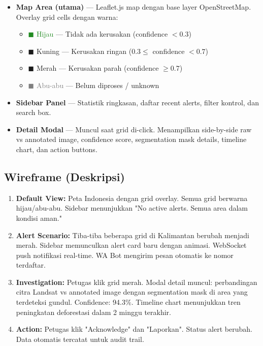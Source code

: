 \documentclass[11pt,a4paper]{article}
\begin{document}
\begin{itemize}
    \item \textbf{Map Area (utama)} --- Leaflet.js map dengan base layer OpenStreetMap. Overlay grid cells dengan warna:
    \begin{itemize}
        \item \textcolor{forestgreen}{$\blacksquare$ Hijau} --- Tidak ada kerusakan (confidence $< 0.3$)
        \item \textcolor{softyellow}{$\blacksquare$ Kuning} --- Kerusakan ringan ($0.3 \le$ confidence $< 0.7$)
        \item \textcolor{alertred}{$\blacksquare$ Merah} --- Kerusakan parah (confidence $\ge 0.7$)
        \item \textcolor{gray}{$\blacksquare$ Abu-abu} --- Belum diproses / unknown
    \end{itemize}
    \item \textbf{Sidebar Panel} --- Statistik ringkasan, daftar recent alerts, filter kontrol, dan search box.
    \item \textbf{Detail Modal} --- Muncul saat grid di-click. Menampilkan side-by-side raw vs annotated image, confidence score, segmentation mask details, timeline chart, dan action buttons.
\end{itemize}

\subsection{Wireframe (Deskripsi)}

\begin{enumerate}
    \item \textbf{Default View:} Peta Indonesia dengan grid overlay. Semua grid berwarna hijau/abu-abu. Sidebar menunjukkan "No active alerts. Semua area dalam kondisi aman."
    \item \textbf{Alert Scenario:} Tiba-tiba beberapa grid di Kalimantan berubah menjadi merah. Sidebar memunculkan alert card baru dengan animasi. WebSocket push notifikasi real-time. WA Bot mengirim pesan otomatis ke nomor terdaftar.
    \item \textbf{Investigation:} Petugas klik grid merah. Modal detail muncul: perbandingan citra Landsat vs annotated image dengan segmentation mask di area yang terdeteksi gundul. Confidence: 94.3\%. Timeline chart menunjukkan tren peningkatan deforestasi dalam 2 minggu terakhir.
    \item \textbf{Action:} Petugas klik "Acknowledge" dan "Laporkan". Status alert berubah. Data otomatis tercatat untuk audit trail.
\end{enumerate}
\end{document}

